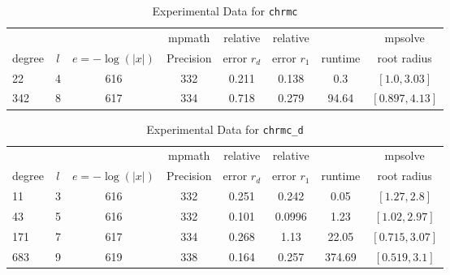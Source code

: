 \documentclass[sigconf]{acmart}
\begin{document}
\begin{table}[t]
\caption{Experimental Data for \texttt{chrmc}} %
\label{tab:chrmc}
\vskip -0.15in
\begin{center}
\begin{small}
\begin{sc}
\begin{tabular}{lccccccc}
\toprule
&  &  & mpmath & relative  & relative &  & mpsolve \\
degree  & $l$& $e=-\log(|x|)$& Precision &error $r_d$       & error $r_1$ &runtime& root radius\\
\midrule
 22 & 4 & 616 & 332 & 0.211 & 0.138 & 0.3 & $[1.0, 3.03]$\\
 342 & 8 & 617 & 334 & 0.718 & 0.279 & 94.64 & $[0.897, 4.13]$\\
\bottomrule
\end{tabular}
\end{sc}
\end{small}
\end{center}
\vskip 0.05in
\end{table}


\begin{table}[t]
\caption{Experimental Data for \texttt{chrmc\_d}} %
\label{tab:chrmc_d}
\vskip -0.15in
\begin{center}
\begin{small}
\begin{sc}
\begin{tabular}{lccccccc}
\toprule
&  &  & mpmath & relative  & relative &  & mpsolve \\
degree  & $l$& $e=-\log(|x|)$& Precision &error $r_d$       & error $r_1$ &runtime& root radius\\
\midrule
11 & 3 & 616 & 332 & 0.251 & 0.242 & 0.05 & $[1.27, 2.8]$\\
 43 & 5 & 616 & 332 & 0.101 & 0.0996 & 1.23 & $[1.02, 2.97]$\\
 171 & 7 & 617 & 334 & 0.268 & 1.13 & 22.05 & $[0.715, 3.07]$\\
 683 & 9 & 619 & 338 & 0.164 & 0.257 & 374.69 & $[0.519, 3.1]$\\
\bottomrule
\end{tabular}
\end{sc}
\end{small}
\end{center}
\vskip 0.05in
\end{table}
\end{document}
